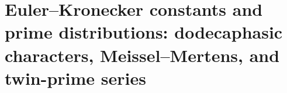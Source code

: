 \chapter{Euler--Kronecker constants and prime distributions: dodecaphasic characters, Meissel--Mertens, and twin-prime series}
\label{chap:p3-final:42:euler_kronecker_primos}

